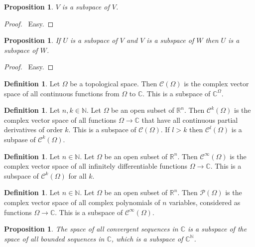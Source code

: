 \documentclass{book}
\let\qed\relax
\newtheorem{prop}[ax]{Proposition}
\theoremstyle{definition}
\newtheorem{df}[ax]{Definition}
\begin{document}
\begin{prop}
$V$ is a subspace of $V$.
\end{prop}

\begin{proof}
\pf\ Easy. \qed
\end{proof}

\begin{prop}
If $U$ is a subspace of $V$ and $V$ is a subspace of $W$ then $U$ is a subspace of $W$.
\end{prop}

\begin{proof}
\pf\ Easy. \qed
\end{proof}

\begin{df}
Let $\Omega$ be a topological space. Then $\mathcal{C}(\Omega)$ is the complex vector space of all continuous functions from $\Omega$ to $\mathbb{C}$. This is a subspace of $\mathbb{C}^\Omega$.
\end{df}

\begin{df}
Let $n, k \in \mathbb{N}$.
Let $\Omega$ be an open subset of $\mathbb{R}^n$. Then $\mathcal{C}^k(\Omega)$ is the complex vector space of all functions $\Omega \rightarrow \mathbb{C}$ that have all continuous partial derivatives of order $k$. This is a subspace of $\mathcal{C}(\Omega)$. If $l > k$ then $\mathcal{C}^l(\Omega)$ is a subpase of $\mathcal{C}^k(\Omega)$.
\end{df}

\begin{df}
Let $n \in \mathbb{N}$. Let $\Omega$ be an open subset of $\mathbb{R}^n$. Then $\mathcal{C}^\infty(\Omega)$ is the complex vector space of all infinitely differentiable functions $\Omega \rightarrow \mathbb{C}$. This is a subspace of $\mathcal{C}^k(\Omega)$ for all $k$.
\end{df}

\begin{df}
Let $n \in \mathbb{N}$. Let $\Omega$ be an open subset of $\mathbb{R}^n$. Then $\mathcal{P}(\Omega)$ is the complex vector space of all complex polynomials of $n$ variables, considered as functions $\Omega \rightarrow \mathbb{C}$. This is a subspace of $\mathcal{C}^\infty(\Omega)$.
\end{df}

\begin{prop}
The space of all convergent sequences in $\mathbb{C}$ is a subspace of the space of all bounded sequences in $\mathbb{C}$, which is a subspace of $\mathbb{C}^\mathbb{N}$.
\end{prop}
\end{document}
